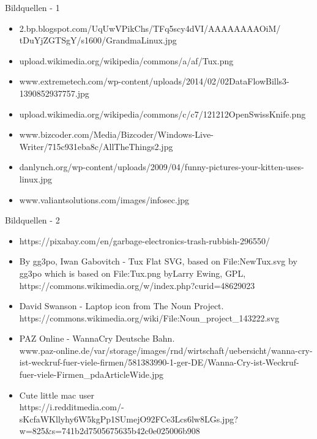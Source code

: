 \begin{frame}{Bildquellen - 1}
	\scriptsize{
			\begin{itemize}
			\item [1] 2.bp.blogspot.com/\textunderscore UqUwVPikChs/TFq5scy4dVI/AAAAAAAAOiM/\\tDuYjZGTSgY/s1600/GrandmaLinux.jpg
			
			\item [2] upload.wikimedia.org/wikipedia/commons/a/af/Tux.png
			
			\item [3] www.extremetech.com/wp-content/uploads/2014/02/02DataFlowBills3-1390852937757.jpg
			
			\item [4] upload.wikimedia.org/wikipedia/commons/c/c7/121212\textunderscore OpenSwissKnife.png
			
			\item [5] www.bizcoder.com/Media/Bizcoder/Windows-Live-Writer/715c931eba8c/AllTheThings\textunderscore 2.jpg
			
			\item [6] danlynch.org/wp-content/uploads/2009/04/funny-pictures-your-kitten-uses-linux.jpg
			
			\item [7] www.valiantsolutions.com/images/infosec.jpg
		\end{itemize}
	}
\end{frame}

\begin{frame}{Bildquellen - 2}
	\scriptsize{
			\begin{itemize}
			\item [8] https://pixabay.com/en/garbage-electronics-trash-rubbish-296550/
			
			\item [9] By gg3po, Iwan Gabovitch - Tux Flat SVG, based on File:NewTux.svg by gg3po which is based on File:Tux.png byLarry Ewing, GPL, 
			https://commons.wikimedia.org/w/index.php?curid=48629023
			
			\item [10] David Swanson - Laptop icon from The Noun Project. 
			https://commons.wikimedia.org/wiki/File:Noun\_project\_143222.svg
			
			\item [11] PAZ Online - WannaCry Deutsche Bahn.\\
			www.paz-online.de/var/storage/images/rnd/wirtschaft/uebersicht/wanna-cry-ist-weckruf-fuer-viele-firmen/581383990-1-ger-DE/Wanna-Cry-ist-Weckruf-fuer-viele-Firmen\_pdaArticleWide.jpg
			
			\item [12] Cute little mac user\\
			https://i.redditmedia.com/-sKcfaWKllyhy6W5kgPp1SUmejO92FCe3Lcs6lw8LGs.jpg?w=825\&s=741b2d7505675635b42c0e025006b908
		\end{itemize}
	}
\end{frame}
